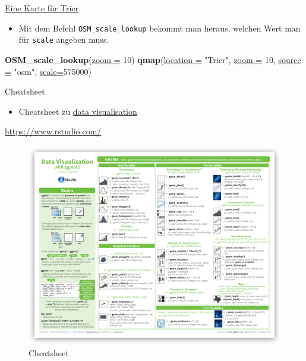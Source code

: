 \documentclass[ignorenonframetext,]{beamer}
\newenvironment{Shaded}{\begin{snugshade}}{\end{snugshade}}
\newcommand{\DataTypeTok}[1]{\textcolor[rgb]{0.74,0.68,0.62}{\underline{#1}}}
\newcommand{\DecValTok}[1]{\textcolor[rgb]{0.27,0.67,0.26}{#1}}
\newcommand{\KeywordTok}[1]{\textcolor[rgb]{0.26,0.66,0.93}{\textbf{#1}}}
\newcommand{\NormalTok}[1]{\textcolor[rgb]{0.74,0.68,0.62}{#1}}
\newcommand{\StringTok}[1]{\textcolor[rgb]{0.02,0.61,0.04}{#1}}
\providecommand{\tightlist}{%
  \setlength{\itemsep}{0pt}\setlength{\parskip}{0pt}}
\begin{document}
\begin{frame}[fragile]{\href{https://blog.dominodatalab.com/geographic-visualization-with-rs-ggmaps/}{Eine
Karte für Trier}}
\protect\hypertarget{eine-karte-fur-trier}{}

\begin{itemize}
\tightlist
\item
  Mit dem Befehl \texttt{OSM\_scale\_lookup} bekommt man heraus, welchen
  Wert man für \texttt{scale} angeben muss.
\end{itemize}

\begin{Shaded}
\begin{Highlighting}[]
\KeywordTok{OSM_scale_lookup}\NormalTok{(}\DataTypeTok{zoom =} \DecValTok{10}\NormalTok{)}
\KeywordTok{qmap}\NormalTok{(}\DataTypeTok{location =} \StringTok{"Trier"}\NormalTok{, }\DataTypeTok{zoom =} \DecValTok{10}\NormalTok{, }\DataTypeTok{source =} \StringTok{"osm"}\NormalTok{,}
     \DataTypeTok{scale=}\DecValTok{575000}\NormalTok{)}
\end{Highlighting}
\end{Shaded}

\end{frame}

\begin{frame}{Cheatsheet}
\protect\hypertarget{cheatsheet}{}

\begin{itemize}
\tightlist
\item
  Cheatsheet zu
  \href{https://www.rstudio.com/wp-content/uploads/2015/04/ggplot2-cheatsheet.pdf}{data
  visualisation}
\end{itemize}

\url{https://www.rstudio.com/}

\begin{figure}
\centering
\includegraphics{figure/ggplot2-cheatsheet.png}
\caption{Cheatsheet}
\end{figure}

\end{frame}
\end{document}
